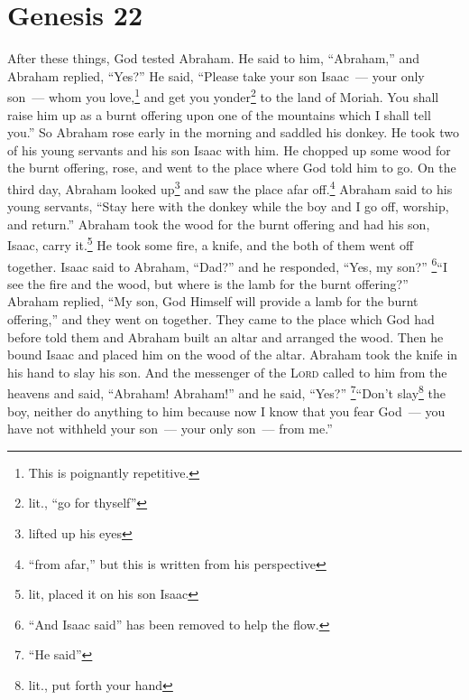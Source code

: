 \section{Genesis 22}\label{Genesis 22}
\begin{enumerate}[align=center]
     After these things, God tested Abraham. He said to him, ``Abraham,'' and Abraham replied, ``Yes?''%
     He said, ``Please take your son Isaac~--- your only son~--- whom you love,\footnote{This is poignantly repetitive.} and get you yonder\footnote{lit., ``go for thyself''} to the land of Moriah. You shall raise him up as a burnt offering upon one of the mountains which I shall tell you.''%
     So Abraham rose early in the morning and saddled his donkey. He took two of his young servants and his son Isaac with him. He chopped up some wood for the burnt offering, rose, and went to the place where God told him to go.%
     On the third day, Abraham looked up\footnote{lifted up his eyes} and saw the place afar off.\footnote{``from afar,'' but this is written from his perspective}%
     Abraham said to his young servants, ``Stay here with the donkey while the boy and I go off, worship, and return.''%
     Abraham took the wood for the burnt offering and had his son, Isaac, carry it.\footnote{lit, placed it on his son Isaac} He took some fire, a knife, and the both of them went off together.%
     Isaac said to Abraham, ``Dad?'' and he responded, ``Yes, my son?'' \footnote{``And Isaac said'' has been removed to help the flow.}``I see the fire and the wood, but where is the lamb for the burnt offering?''%
     Abraham replied, ``My son, God Himself will provide a lamb for the burnt offering,'' and they went on together.%
     They came to the place which God had before told them and Abraham built an altar and arranged the wood. Then he bound Isaac and placed him on the wood of the altar.%
     Abraham took the knife in his hand to slay his son.%
     And the messenger of the \textsc{Lord} called to him from the heavens and said, ``Abraham! Abraham!'' and he said, ``Yes?''%
     \footnote{``He said''}``Don't slay\footnote{lit., put forth your hand} the boy, neither do anything to him because now I know that you fear God~--- you have not withheld your son~--- your only son~--- from me.''%

\end{enumerate}

